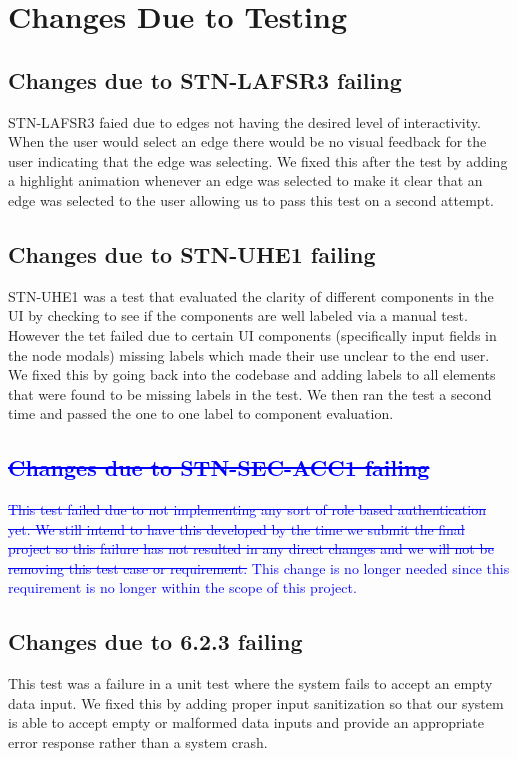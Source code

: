 \documentclass[12pt, titlepage]{article}
\begin{document}
\section{Changes Due to Testing}

\subsection{Changes due to STN-LAFSR3 failing}
STN-LAFSR3 faied due to edges not having the desired level of interactivity. When the user would select an edge there would be no visual feedback for the user indicating that the edge was selecting. We fixed this after the test by adding a highlight animation whenever an edge was selected to make it clear that an edge was selected to the user allowing us to pass this test on a second attempt. 

\subsection{Changes due to STN-UHE1 failing}
STN-UHE1 was a test that evaluated the clarity of different components in the UI by checking to see if the components are well labeled via a manual test. However the tet failed due to certain UI components (specifically input fields in the node modals) missing labels which made their use unclear to the end user. We fixed this by going back into the codebase and adding labels to all elements that were found to be missing labels in the test. We then ran the test a second time and passed the one to one label to component evaluation. 

\subsection{\textcolor{blue}{\sout{Changes due to STN-SEC-ACC1 failing}}}
\textcolor{blue}{\sout{This test failed due to not implementing any sort of role based authentication yet. We still intend to have this developed by the time we submit the final project so this failure has not resulted in any direct changes and we will not be removing this test case or requirement.} This change is no longer needed since this requirement is no longer within the scope of this project.} 

\subsection{Changes due to 6.2.3 failing}
This test was a failure in a unit test where the system fails to accept an empty data input. We fixed this by adding proper input sanitization so that our system is able to accept empty or malformed data inputs and provide an appropriate error response rather than a system crash. 
\end{document}
